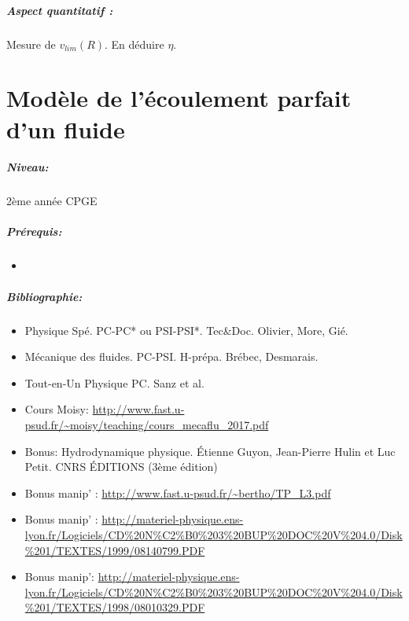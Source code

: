 \documentclass[11pt]{report}
\numberwithin{figure}{section}
\numberwithin{equation}{section}
\numberwithin{table}{section}
\newcommand{\1}{\boldsymbol{1}}
\begin{document}
\begin{tcolorbox}[breakable, enhanced, colback=red!2!white,colframe=mycolor!85!black,title=\textbf{\textbf{Expérience}}]
\paragraph*{Aspect quantitatif :} Mesure de $v_{lim}(R)$. En déduire $\eta$. 


\end{tcolorbox}


\newpage




\chapter{Modèle de l'écoulement parfait d'un fluide}


\paragraph*{Niveau:} 2ème année CPGE
\paragraph*{Prérequis:} 
\begin{itemize}
\item 
\end{itemize}

\paragraph*{Bibliographie:}
\begin{itemize}
\item Physique Spé. PC-PC* ou PSI-PSI*. Tec\&Doc. Olivier, More, Gié.
\item Mécanique des fluides. PC-PSI. H-prépa. Brébec, Desmarais.
\item Tout-en-Un Physique PC. Sanz et al.
\item Cours Moisy: \url{http://www.fast.u-psud.fr/~moisy/teaching/cours_mecaflu_2017.pdf}
\item Bonus: Hydrodynamique physique. \'Etienne Guyon, Jean-Pierre Hulin et Luc Petit.  CNRS ÉDITIONS (3ème édition) 
\item Bonus manip' : \url{http://www.fast.u-psud.fr/~bertho/TP_L3.pdf}
\item Bonus manip' : \url{http://materiel-physique.ens-lyon.fr/Logiciels/CD%20N%C2%B0%203%20BUP%20DOC%20V%204.0/Disk%201/TEXTES/1999/08140799.PDF}
\item Bonus manip': \url{http://materiel-physique.ens-lyon.fr/Logiciels/CD%20N%C2%B0%203%20BUP%20DOC%20V%204.0/Disk%201/TEXTES/1998/08010329.PDF}
\end{itemize}
\end{document}
